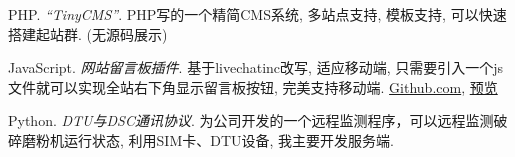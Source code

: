    \item{
       PHP.
       \emph{``TinyCMS''}.
       PHP写的一个精简CMS系统, 多站点支持, 模板支持, 可以快速搭建起站群. (无源码展示)
   }
   \item{
       JavaScript.
       \emph{网站留言板插件}.
       基于livechatinc改写, 适应移动端, 只需要引入一个js文件就可以实现全站右下角显示留言板按钮, 完美支持移动端. \href{https://github.com/leadscloud/leadscloud.github.io/tree/master/livechat}{Github.com},
       \href{https://cdn.livechatinc.xyz/}{预览}
   }
   \item{
       Python.
       \emph{DTU与DSC通讯协议}.
       为公司开发的一个远程监测程序，可以远程监测破碎磨粉机运行状态, 利用SIM卡、DTU设备, 我主要开发服务端.
   }

 \resumeSubHeadingListEnd
